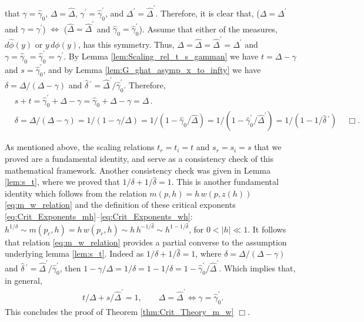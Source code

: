 \documentclass[english,12pt,jmp,graphicx]{revtex4-1}
\newcommand{\ph}{\hat{\phi}}
\newcommand{\gh}{\hat{\gamma}}
\newcommand{\Dh}{\hat{\Delta}}
\newcommand{\dha}{\hat{\delta}}
\begin{document}
that $\gamma=\gh_0$, $\Delta=\Dh$, $\gamma^\prime=\gh_0^\prime$, and $\Delta^\prime=\Dh^\prime$. Therefore, it
is clear that, ($\Delta=\Delta^\prime$ and $\gamma=\gamma^\prime$) $\iff$ ($\Dh=\Dh^\prime$ and
$\gh_0=\gh_0^\prime$). Assume that either of the measures, $d\ph(y)$
or $y\,d\phi(y)$, has this symmetry. Thus, $\Delta=\Dh=\Dh^\prime=\Delta^\prime$ and
$\gamma=\gh_0=\gh_0^\prime=\gamma^\prime$. By
Lemma \ref{lem:Scaling_rel_t_s_gamman} we have $t=\Delta-\gamma$ and
$s=\gh_0^\prime$, and by Lemma \ref{lem:G_ghat_asymp_x_to_infty} we have
$\delta=\Delta/(\Delta-\gamma)$ and $\dha\,^\prime=\Dh^\prime/\gh_0^\prime$. Therefore,    
%
\begin{align*}
  &s+t=\gh_0^\prime+\Delta-\gamma=\gh_0+\Delta-\gamma=\Delta\,.\\
  &\delta=\Delta/(\Delta-\gamma)=1/(1-\gamma/\Delta)=1/(1-\gh_0/\Dh)=1/(1-\gh_0^\prime/\Dh^\prime)=1/(1-1/\dha\,^\prime)\,
  \quad \Box.
\end{align*}

As mentioned above, the scaling relations $t_r=t_i=t$ and $s_r=s_i=s$
that we proved are a fundamental identity, and serve as a consistency
check of this mathematical framework. Another consistency check was
given in Lemma \ref{lem:s_t}, where we proved that
$1/\delta+1/\dha=1$. This is another fundamental identity which follows
from the relation $m(p,h)=h\,w(p,z(h))$ \eqref{eq:m_w_relation} and
the definition of these critical exponents
\eqref{eq:Crit_Exponents_mh}--\eqref{eq:Crit_Exponents_wh}:
$h^{1/\delta}\sim m(p_c,h)=h\,w(p_c,h)\sim h\,h^{-1/\dha}\sim h^{1-1/\dha}$, for
$0<|h|\ll1$. It follows that relation \eqref{eq:m_w_relation} provides a
partial converse to the assumption underlying lemma
\ref{lem:s_t}. Indeed as $1/\delta+1/\dha=1$, where $\delta=\Delta/(\Delta-\gamma)$ and
$\dha\,^\prime=\Dh^\prime/\gh_0^\prime$, then
$1-\gamma/\Delta=1/\delta=1-1/\dha=1-\gh_0^\prime/\Dh^\prime$. Which implies that, in general, 
%
\begin{align}
  t/\Delta+s/\Dh^\prime=1, \qquad
  \Delta=\Dh^\prime\iff\gamma=\gh_0^\prime.
\end{align}
%
This concludes the proof of Theorem \ref{thm:Crit_Theory_m_w} $\Box$.
%
%
\end{document}
